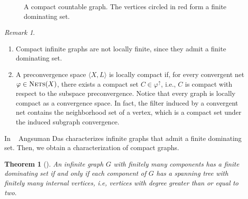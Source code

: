 \documentclass{amsart}
\newtheorem{theorem}{Theorem}[section]
\theoremstyle{definition}
\theoremstyle{remark}
\newtheorem{remark}{Remark}[section]
\numberwithin{equation}{section}
\begin{document}
\begin{figure}[H]
	\caption{A compact countable graph. The vertices circled in red form a finite dominating set.}
	\label{exm3}
\end{figure}



\begin{remark}
	\text{}
\begin{enumerate}
	
	\item Compact infinite graphs are not locally finite, since they admit a finite dominating set.
	
	\item A preconvergence space $\langle X,L\rangle$ is locally compact if, for every convergent net $\varphi\in\textsc{Nets}(X)$, there exists a compact set $C\in \varphi^\uparrow$, i.e., $C$ is compact with respect to the subspace preconvergence. Notice that every graph is locally compact as a convergence space. In fact, the filter induced by a convergent net contains the neighborhood set of a vertex, which is a compact set under the induced subgraph convergence.
	
\end{enumerate}
\end{remark}


In ~\cite{Das2017} Angsuman Das characterizes infinite graphs that admit a finite dominating set. Then, we obtain a characterization of compact graphs.

\begin{theorem}[{\cite[Corollary 3.1]{Das2017}}]
	
	\label{domin}
	An infinite graph $G$ with finitely many components has a finite dominating set if and only if each component of $G$ has a spanning tree with finitely many internal vertices, i.e, vertices with degree greater than or equal to two.
\end{theorem}
\end{document}
